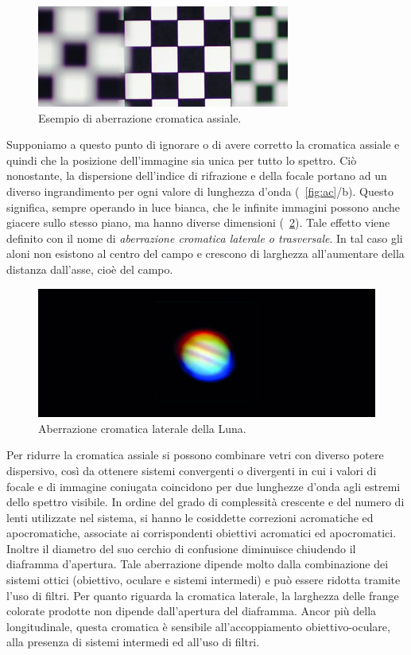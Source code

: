 \begin{figure}
 \centering
 \includegraphics[scale=.88]{img/CAP2aca.jpg}
 \caption{\small{Esempio di aberrazione cromatica assiale.}}
 \label{fig:aca}
\end{figure}

Supponiamo a questo punto di ignorare o di avere corretto la cromatica assiale e quindi che la posizione dell'immagine sia unica per tutto lo spettro.
Ciò nonostante, la dispersione dell'indice di rifrazione e della focale portano ad un diverso ingrandimento per ogni valore di lunghezza d'onda (\figurename~\ref{fig:ac}/b). 
Questo significa, sempre operando in luce bianca, che le infinite immagini possono anche giacere sullo stesso piano, ma hanno diverse dimensioni (\figurename~\ref{fig:acl}). 
Tale effetto viene definito con il nome di \textit{aberrazione cromatica laterale o trasversale}.
In tal caso gli aloni non esistono al centro del campo e crescono di larghezza all'aumentare della distanza dall'asse, cioè del campo.

\begin{figure}
 \centering
 \includegraphics[scale=.40]{img/CAP2acl.jpg}
 \caption{\small{Aberrazione cromatica laterale della Luna.}}
 \label{fig:acl}
\end{figure}

Per ridurre la cromatica assiale si possono combinare vetri con diverso potere dispersivo, così da ottenere sistemi convergenti o divergenti in cui i valori di focale e di immagine coniugata coincidono per due lunghezze d'onda agli estremi dello spettro visibile. 
In ordine del grado di complessità crescente e del numero di lenti utilizzate nel sistema, si hanno le cosiddette correzioni acromatiche ed apocromatiche, associate ai corrispondenti obiettivi acromatici ed apocromatici. 
Inoltre il diametro del suo cerchio di confusione diminuisce chiudendo il diaframma d'apertura. 
Tale aberrazione dipende molto dalla combinazione dei sistemi ottici (obiettivo, oculare e sistemi intermedi) e può essere ridotta tramite l'uso di filtri. 
Per quanto riguarda la cromatica laterale, la larghezza delle frange colorate prodotte non dipende dall'apertura del diaframma.
Ancor più della longitudinale, questa cromatica è sensibile all'accoppiamento obiettivo-oculare, alla presenza di sistemi intermedi ed all'uso di filtri.

